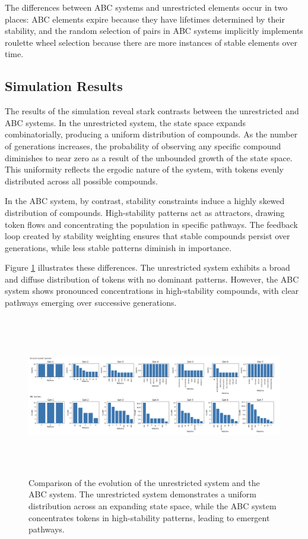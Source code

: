 \documentclass[entropy,article,submit,pdftex,oneauthor]{Definitions/mdpi}
\begin{document}
The differences between ABC systems and unrestricted elements occur in two places: ABC elements expire because they have lifetimes determined by their stability, and the random selection of pairs in ABC systems implicitly implements roulette wheel selection \cite{goldberg1989genetic} \cite{holland1975adaptation} because there are more instances of stable elements over time. 

\subsection{Simulation Results}

The results of the simulation reveal stark contrasts between the unrestricted and ABC systems. In the unrestricted system, the state space expands combinatorially, producing a uniform distribution of compounds. As the number of generations increases, the probability of observing any specific compound diminishes to near zero as a result of the unbounded growth of the state space. This uniformity reflects the ergodic nature of the system, with tokens evenly distributed across all possible compounds.

In the ABC system, by contrast, stability constraints induce a highly skewed distribution of compounds. High-stability patterns act as attractors, drawing token flows and concentrating the population in specific pathways. The feedback loop created by stability weighting ensures that stable compounds persist over generations, while less stable patterns diminish in importance.

Figure \ref{fig:simulation_results} illustrates these differences. The unrestricted system exhibits a broad and diffuse distribution of tokens with no dominant patterns. However, the ABC system shows pronounced concentrations in high-stability compounds, with clear pathways emerging over successive generations.

\begin{figure}[h]
    \centering
    \includegraphics[width=1\textwidth,height=7cm]{monte-carlo-fits.png}
    \caption{Comparison of the evolution of the unrestricted system and the ABC system. The unrestricted system demonstrates a uniform distribution across an expanding state space, while the ABC system concentrates tokens in high-stability patterns, leading to emergent pathways.}
    \label{fig:simulation_results}
\end{figure}
\end{document}
